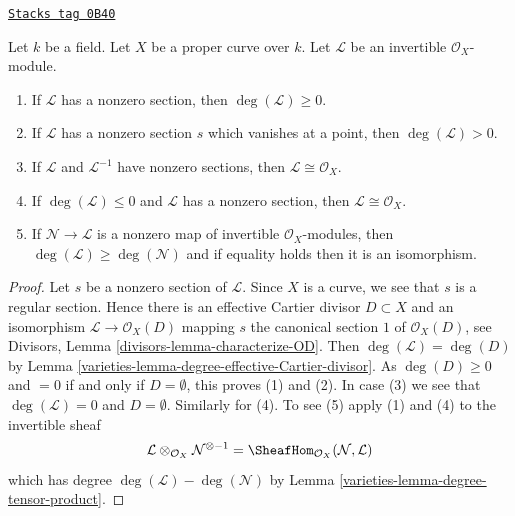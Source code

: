 \begin{lemma}
\label{varieties-lemma-check-invertible-sheaf-trivial}
\href{https://stacks.math.columbia.edu/tag/0B40}{\texttt{Stacks tag 0B40}}

Let $k$ be a field. Let $X$ be a proper curve over $k$.
Let $\mathcal{L}$ be an invertible $\mathcal{O}_X$-module.
\begin{enumerate}
\item If $\mathcal{L}$ has a nonzero section, then
$\deg(\mathcal{L}) \geq 0$.
\item If $\mathcal{L}$ has a nonzero section $s$ which vanishes
at a point, then $\deg(\mathcal{L}) > 0$.
\item If $\mathcal{L}$ and $\mathcal{L}^{-1}$ have nonzero sections, then
$\mathcal{L} \cong \mathcal{O}_X$.
\item If $\deg(\mathcal{L}) \leq 0$ and $\mathcal{L}$ has a nonzero
section, then $\mathcal{L} \cong \mathcal{O}_X$.
\item If $\mathcal{N} \to \mathcal{L}$ is a nonzero map of invertible
$\mathcal{O}_X$-modules, then $\deg(\mathcal{L}) \geq \deg(\mathcal{N})$
and if equality holds then it is an isomorphism.
\end{enumerate}
\end{lemma}

\begin{proof}

Let $s$ be a nonzero section of $\mathcal{L}$. Since $X$ is a curve, we
see that $s$ is a regular section. Hence there is an effective
Cartier divisor $D \subset X$ and an isomorphism
$\mathcal{L} \to \mathcal{O}_X(D)$ mapping $s$ the canonical
section $1$ of $\mathcal{O}_X(D)$, see
Divisors, Lemma \ref{divisors-lemma-characterize-OD}.
Then $\deg(\mathcal{L}) = \deg(D)$ by
Lemma \ref{varieties-lemma-degree-effective-Cartier-divisor}.
As $\deg(D) \geq 0$ and $= 0$
if and only if $D = \emptyset$, this proves (1) and (2).
In case (3) we see that $\deg(\mathcal{L}) = 0$ and
$D = \emptyset$. Similarly for (4). To see (5) apply
(1) and (4) to the invertible sheaf
$$
\mathcal{L} \otimes_{\mathcal{O}_X} \mathcal{N}^{\otimes -1} =
\SheafHom_{\mathcal{O}_X}(\mathcal{N}, \mathcal{L})
$$
which has degree $\deg(\mathcal{L}) - \deg(\mathcal{N})$
by Lemma \ref{varieties-lemma-degree-tensor-product}.
\end{proof}

